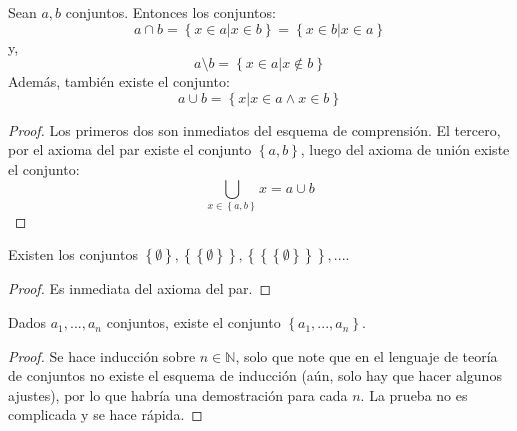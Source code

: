 \documentclass[12pt]{report}
\theoremstyle{largebreak}
\begin{document}
    \begin{propo}
        Sean $a,b$ conjuntos. Entonces los conjuntos:
        \begin{equation*}
            a\cap b=\left\{x\in a\Big|x\in b \right\}=\left\{x\in b\Big|x\in a \right\}
        \end{equation*}
        y,
        \begin{equation*}
            a\setminus b=\left\{x\in a\Big|x\notin b \right\}
        \end{equation*}
        Además, también existe el conjunto:
        \begin{equation*}
            a\cup b=\left\{x\Big|x\in a\land x\in b \right\}
        \end{equation*}
    \end{propo}

    \begin{proof}
        Los primeros dos son inmediatos del esquema de comprensión. El tercero, por el axioma del par existe el conjunto $\left\{a,b \right\}$, luego del axioma de unión existe el conjunto:
        \begin{equation*}
            \bigcup_{ x\in\left\{a,b \right\}}x=a\cup b
        \end{equation*}
    \end{proof}

    \begin{propo}
        Existen los conjuntos $\left\{\emptyset \right\},\left\{\left\{\emptyset \right\}\right\},\left\{\left\{\left\{\emptyset \right\}\right\}\right\},...$.
    \end{propo}

    \begin{proof}
        Es inmediata del axioma del par.
    \end{proof}

    \begin{lema}
        Dados $a_1,...,a_n$ conjuntos, existe el conjunto $\left\{a_1,...,a_n\right\}$.
    \end{lema}

    \begin{proof}
        Se hace inducción sobre $n\in\mathbb{N}$, solo que note que en el lenguaje de teoría de conjuntos no existe el esquema de inducción (aún, solo hay que hacer algunos ajustes), por lo que habría una demostración para cada $n$. La prueba no es complicada y se hace rápida.
    \end{proof}
\end{document}
